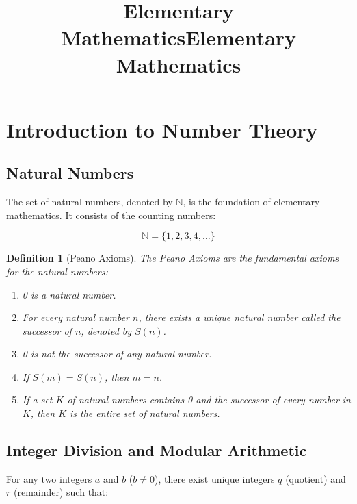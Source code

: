 \documentclass[12pt]{article}
\title{\ifDarkMode\textcolor{draculaPink}{\Huge Elementary Mathematics}\else\Huge Elementary Mathematics\fi}
\author{}
\date{}
\newif\ifDarkMode
\newcommand{\numcolor}[1]{\ifDarkMode\textcolor{draculaOrange}{#1}\else#1\fi}
\newcommand{\varcolor}[1]{\ifDarkMode\textcolor{draculaGreen}{#1}\else#1\fi}
\newtheorem{definition}[theorem]{Definition}
\begin{document}
\maketitle

\tableofcontents

\section{\textcolor{draculaCyan}{Introduction to Number Theory}}

\subsection{\textcolor{draculaYellow}{Natural Numbers}}

The set of natural numbers, denoted by $\varcolor{\mathbb{N}}$, is the foundation of elementary mathematics. It consists of the counting numbers:

\[
\varcolor{\mathbb{N}} = \{\numcolor{1}, \numcolor{2}, \numcolor{3}, \numcolor{4}, \ldots\}
\]

\begin{definition}[Peano Axioms]
The Peano Axioms are the fundamental axioms for the natural numbers:
\begin{enumerate}
    \item 0 is a natural number.
    \item For every natural number $\varcolor{n}$, there exists a unique natural number called the successor of $\varcolor{n}$, denoted by $\varcolor{S(n)}$.
    \item 0 is not the successor of any natural number.
    \item If $\varcolor{S(m) = S(n)}$, then $\varcolor{m = n}$.
    \item If a set $\varcolor{K}$ of natural numbers contains 0 and the successor of every number in $\varcolor{K}$, then $\varcolor{K}$ is the entire set of natural numbers.
\end{enumerate}
\end{definition}

\subsection{\textcolor{draculaYellow}{Integer Division and Modular Arithmetic}}

For any two integers $\varcolor{a}$ and $\varcolor{b}$ ($\varcolor{b} \neq \numcolor{0}$), there exist unique integers $\varcolor{q}$ (quotient) and $\varcolor{r}$ (remainder) such that:
\end{document}
